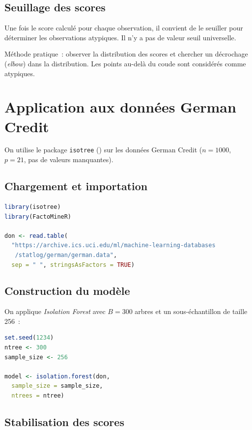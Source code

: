 \documentclass[a4paper,11pt]{article}
\theoremstyle{definition}
\theoremstyle{remark}
\begin{document}
\subsection{Seuillage des scores}

Une fois le score calcul\'e pour chaque observation, il convient de le
seuiller pour d\'eterminer les observations atypiques. Il n'y a pas de
valeur seuil universelle.

M\'ethode pratique~: observer la distribution des scores et chercher
un d\'ecrochage (\emph{elbow}) dans la distribution. Les points au-del\`a
du coude sont consid\'er\'es comme atypiques.

\section{Application aux donn\'ees German Credit}

On utilise le package \texttt{isotree} (\cite{Cortes2026}) sur les donn\'ees
German Credit ($n=1000$, $p=21$, pas de valeurs manquantes).

\subsection{Chargement et importation}

\begin{lstlisting}[language=R]
library(isotree)
library(FactoMineR)

don <- read.table(
  "https://archive.ics.uci.edu/ml/machine-learning-databases
   /statlog/german/german.data",
  sep = " ", stringsAsFactors = TRUE)
\end{lstlisting}

\subsection{Construction du mod\`ele}

On applique \emph{Isolation Forest} avec $B = 300$ arbres et un
sous-\'echantillon de taille 256~:

\begin{lstlisting}[language=R]
set.seed(1234)
ntree <- 300
sample_size <- 256

model <- isolation.forest(don,
  sample_size = sample_size,
  ntrees = ntree)
\end{lstlisting}

\subsection{Stabilisation des scores}
\end{document}

